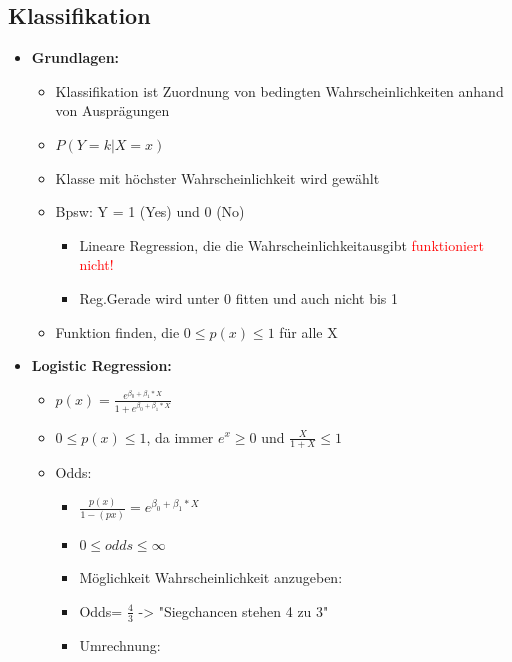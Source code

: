 \documentclass[a4paper]{article}
\begin{document}
\begin{landscape}
\begin{multicols}{3}
        \section{Klassifikation}
        \begin{itemize}[noitemsep,nolistsep,leftmargin=*]
            \item \textbf{Grundlagen:}
            \begin{itemize}[noitemsep,nolistsep,leftmargin=*]
                \item Klassifikation ist Zuordnung von bedingten Wahrscheinlichkeiten anhand von Ausprägungen
                \item $P(Y = k | X=x)$
                \item Klasse mit höchster Wahrscheinlichkeit wird gewählt
                \item Bpsw: Y = 1 (Yes) und 0 (No)
                \begin{itemize}[noitemsep,nolistsep,leftmargin=*]
                    \item Lineare Regression, die die Wahrscheinlichkeitausgibt \textcolor{red}{funktioniert nicht!}
                    \item Reg.Gerade wird unter 0 fitten und auch nicht bis 1
                \end{itemize}
                \item Funktion finden, die $0 \leq p(x) \leq 1$ für alle X
            \end{itemize}
            \item \textbf{Logistic Regression:}
            \begin{itemize}[noitemsep,nolistsep,leftmargin=*]
                \item $p(x) = \frac{e^{\beta_0+\beta_1*X}}{1+e^{\beta_0+\beta_1*X}}$
                \item $0 \leq p(x) \leq 1$, da immer $e^x \geq 0$ und $\frac{X}{1+X}\leq 1$
                \item Odds:
                \begin{itemize}[noitemsep,nolistsep,leftmargin=*]
                    \item $\frac{p(x)}{1-(px)}= e^{\beta_0+\beta_1*X}$
                    \item $0 \leq odds \leq \infty$
                    \item Möglichkeit Wahrscheinlichkeit anzugeben:
                    \item Odds= $\frac{4}{3}$ -> "Siegchancen stehen 4 zu 3"
                    \item Umrechnung:

\end{itemize}
\end{itemize}
\end{itemize}
\end{multicols}
\end{landscape}
\end{document}
